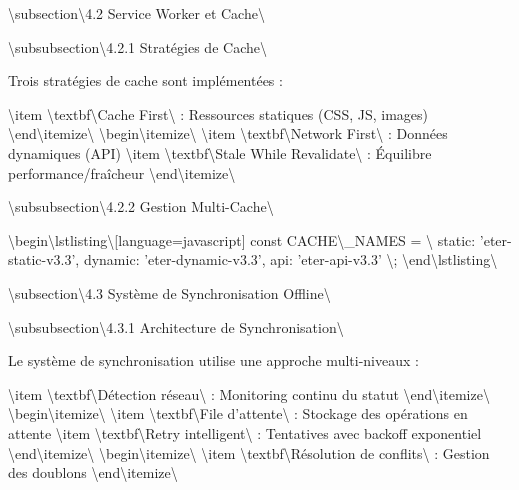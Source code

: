 \documentclass[12pt,a4paper]{report}
\begin{document}
\textbackslash{}subsection\textbackslash{}{4.2 Service Worker et Cache\textbackslash{}}

\textbackslash{}subsubsection\textbackslash{}{4.2.1 Stratégies de Cache\textbackslash{}}

Trois stratégies de cache sont implémentées :

\textbackslash{}item \textbackslash{}textbf\textbackslash{}{Cache First\textbackslash{}} : Ressources statiques (CSS, JS, images)
\textbackslash{}end\textbackslash{}{itemize\textbackslash{}}
\textbackslash{}begin\textbackslash{}{itemize\textbackslash{}}
\textbackslash{}item \textbackslash{}textbf\textbackslash{}{Network First\textbackslash{}} : Données dynamiques (API)
\textbackslash{}item \textbackslash{}textbf\textbackslash{}{Stale While Revalidate\textbackslash{}} : Équilibre performance/fraîcheur
\textbackslash{}end\textbackslash{}{itemize\textbackslash{}}

\textbackslash{}subsubsection\textbackslash{}{4.2.2 Gestion Multi-Cache\textbackslash{}}

\textbackslash{}begin\textbackslash{}{lstlisting\textbackslash{}}[language=javascript]
const CACHE\textbackslash{}_NAMES = \textbackslash{}{
    static: 'eter-static-v3.3',
    dynamic: 'eter-dynamic-v3.3',
    api: 'eter-api-v3.3'
\textbackslash{}};
\textbackslash{}end\textbackslash{}{lstlisting\textbackslash{}}

\textbackslash{}subsection\textbackslash{}{4.3 Système de Synchronisation Offline\textbackslash{}}

\textbackslash{}subsubsection\textbackslash{}{4.3.1 Architecture de Synchronisation\textbackslash{}}

Le système de synchronisation utilise une approche multi-niveaux :

\textbackslash{}item \textbackslash{}textbf\textbackslash{}{Détection réseau\textbackslash{}} : Monitoring continu du statut
\textbackslash{}end\textbackslash{}{itemize\textbackslash{}}
\textbackslash{}begin\textbackslash{}{itemize\textbackslash{}}
\textbackslash{}item \textbackslash{}textbf\textbackslash{}{File d'attente\textbackslash{}} : Stockage des opérations en attente
\textbackslash{}item \textbackslash{}textbf\textbackslash{}{Retry intelligent\textbackslash{}} : Tentatives avec backoff exponentiel
\textbackslash{}end\textbackslash{}{itemize\textbackslash{}}
\textbackslash{}begin\textbackslash{}{itemize\textbackslash{}}
\textbackslash{}item \textbackslash{}textbf\textbackslash{}{Résolution de conflits\textbackslash{}} : Gestion des doublons
\textbackslash{}end\textbackslash{}{itemize\textbackslash{}}
\end{document}
